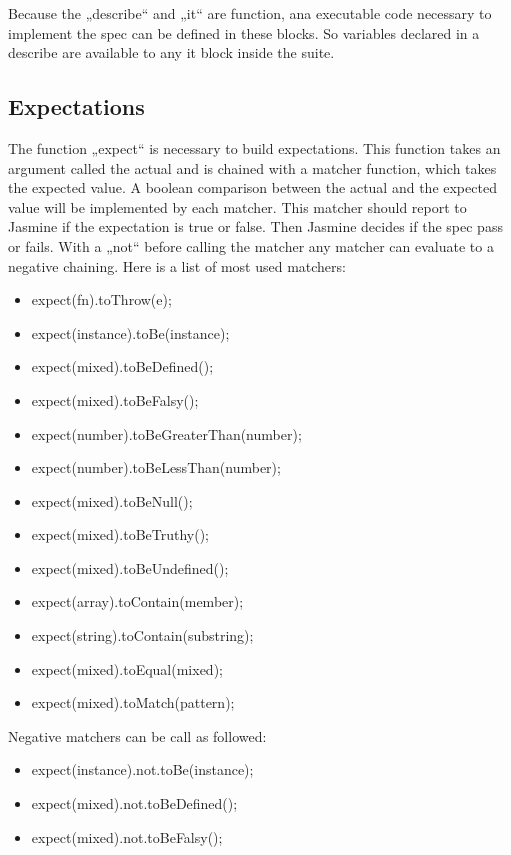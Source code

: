 \documentclass[11pt]{article}
\begin{document}
Because the „describe“ and „it“ are function, ana executable code necessary to implement the spec can be defined in these blocks. So variables declared in a describe are available to any it block inside the suite.

\subsection{Expectations}

The function „expect“ is necessary to build expectations. This function takes an argument called the actual and is chained with a matcher function, which takes the expected value. A boolean comparison between the actual and the expected value will be implemented by each matcher. This matcher should report to Jasmine if the expectation is true or false. Then Jasmine decides if the spec pass or fails. With a „not“ before calling the matcher any matcher can evaluate to a negative chaining. Here is a list of most used matchers:

\begin{itemize}
\item expect(fn).toThrow(e);
\item expect(instance).toBe(instance);
\item expect(mixed).toBeDefined();
\item expect(mixed).toBeFalsy();
\item expect(number).toBeGreaterThan(number);
\item expect(number).toBeLessThan(number);
\item expect(mixed).toBeNull();
\item expect(mixed).toBeTruthy();
\item expect(mixed).toBeUndefined();
\item expect(array).toContain(member);
\item expect(string).toContain(substring);
\item expect(mixed).toEqual(mixed);
\item expect(mixed).toMatch(pattern);
\end{itemize}

Negative matchers can be call as followed:

\begin{itemize}
\item expect(instance).not.toBe(instance);
\item expect(mixed).not.toBeDefined();
\item expect(mixed).not.toBeFalsy();
\end{itemize}
\end{document}

